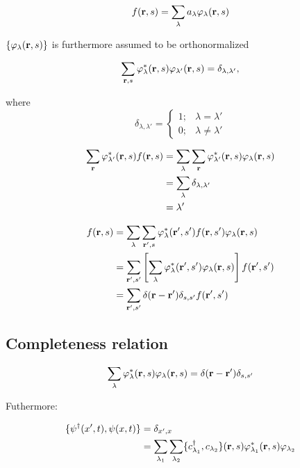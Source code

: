 \begin{equation}
	f(\vb{r},s) = \sum_\lambda a_\lambda \varphi_\lambda (\vb{r}, s)
\end{equation}

$\{ \varphi_\lambda(\vb{r},s) \}$ is furthermore assumed to be orthonormalized

\begin{equation}
	\sum_{\vb{r},s} \varphi_\lambda^* (\vb{r},s) \varphi_{\lambda'} (\vb{r},s) = \delta_{\lambda, \lambda'},
\end{equation}

where 
\[
	\delta_{\lambda, \lambda'}=
\begin{cases}
	1;& \lambda = \lambda'\\
	0; & \lambda \neq \lambda' 
\end{cases}
\]

\begin{align*}
	\sum_{\vb{r}} \varphi_{\lambda'}^*(\vb{r},s) f(\vb{r},s) &= \sum_\lambda \sum_{\vb{r}} \varphi_{\lambda'}^*(\vb{r},s) \varphi_\lambda(\vb{r},s)\\
	&= \sum_\lambda \delta_{\lambda, \lambda'}\\
	&= \lambda'
\end{align*}

\begin{align*}
	f(\vb{r},s) &= \sum_\lambda \sum_{\vb{r'},s} \varphi_\lambda^* (\vb{r'},s') f(\vb{r},s') \varphi_\lambda (\vb{r},s)\\
	&= \sum_{\vb{r'},s'} \left[ \sum_\lambda \varphi_\lambda^* (\vb{r'},s') \varphi_\lambda (\vb{r},s) \right] f(\vb{r'},s') \\
	&= \sum_{\vb{r'},s'} \delta(\vb{r}-\vb{r'}) \delta_{s,s'} f(\vb{r'},s')
\end{align*}
 
\subsection{Completeness relation}

\begin{equation}
	\sum_\lambda \varphi_\lambda^* (\vb{r},s) \varphi_\lambda(\vb{r},s) = \delta(\vb{r}-\vb{r'}) \delta_{s,s'}
\end{equation}

Futhermore:

\begin{align}
	\{ \psi^\dagger(x',t), \psi(x,t) \} &= \delta_{x',x} \label{complete_1} \\
	&= \sum_{\lambda_1} \sum_{\lambda_2} \{c^{\dagger}_{\lambda_1}, c_{\lambda_2} \} (\vb{r},s)  \varphi_{\lambda_1}^* (\vb{r},s) \varphi_{\lambda_2} \nonumber
\end{align}

